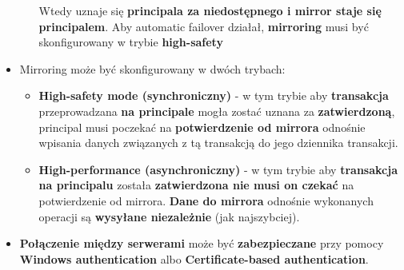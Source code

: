 \documentclass[a4paper]{article}
\begin{document}
\begin{itemize}[noitemsep]
\begin{itemize}[noitemsep]
            Wtedy uznaje się \textbf{principala za niedostępnego i mirror staje się principalem}. Aby automatic failover
            działał, \textbf{mirroring} musi być skonfigurowany w trybie \textbf{high-safety}
        \end{itemize}
        \item Mirroring może być skonfigurowany w dwóch trybach:
        \begin{itemize}[noitemsep]
            \item \textbf{High-safety mode (synchroniczny)} - w tym trybie aby \textbf{transakcja} przeprowadzana
            \textbf{na principale} mogła zostać uznana za \textbf{zatwierdzoną}, principal musi poczekać na
            \textbf{potwierdzenie od mirrora} odnośnie wpisania danych związanych z tą transakcją do jego dziennika
            transakcji.
            \item \textbf{High-performance (asynchroniczny)} - w tym trybie aby \textbf{transakcja na principalu}
            została \textbf{zatwierdzona nie musi on czekać} na potwierdzenie od mirrora. \textbf{Dane do mirrora}
            odnośnie wykonanych operacji są \textbf{wysyłane niezależnie} (jak najszybciej).
        \end{itemize}
        \item \textbf{Połączenie między serwerami} może być \textbf{zabezpieczane} przy pomocy \textbf{Windows
        authentication} albo \textbf{Certificate-based authentication}.
    \end{itemize}
\end{document}
